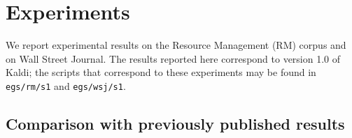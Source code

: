 \documentclass[10pt,conference,letterpaper]{IEEEtran}
\def \st {\small \tt}
\begin{document}
\section{Experiments}
\label{sec:expt}
We report experimental results on the Resource Management (RM) corpus and on 
Wall Street Journal.  
The results reported here correspond to version 1.0 of Kaldi; the scripts that 
correspond to these experiments may be found in {\st egs/rm/s1} and 
{\st egs/wsj/s1}.





\subsection{Comparison with previously published results}


\begin{table}
\end{table}
\end{document}
